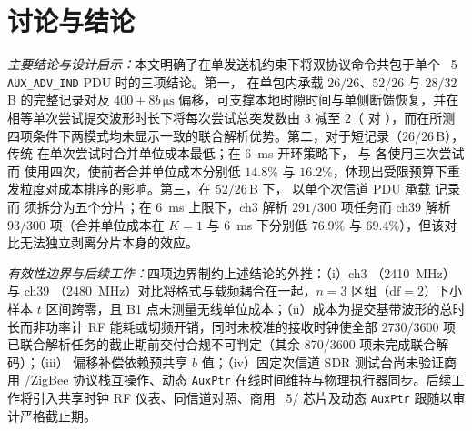 \section{讨论与结论}\label{sec:conclusion}

\emph{主要结论与设计启示：}本文明确了在单发送机约束下将双协议命令共包于单个 \ble{}~5 \texttt{AUX\_ADV\_IND} PDU 时的三项结论。第一，\proto{} 在单包内承载 $26/26$、$52/26$ 与 $28/32$\,B 的完整记录对及 $400{+}8b\,\si{\micro\second}$ 偏移，可支撑本地时隙时间与单侧断馈恢复，并在相等单次尝试提交波形时长下将每次尝试总突发数由 $3$ 减至 $2$（\modejc{} 对 \modesc{}），而在所测四项条件下两模式均未显示一致的联合解析优势。第二，对于短记录（$26/26$\,B），传统 \modelc{} 在单次尝试时合并单位成本最低；在 \SI{6}{ms} 开环策略下，\modejc{} 与 \modesc{} 各使用三次尝试而 \modelc{} 使用四次，使前者合并单位成本分别低 $14.8\%$ 与 $16.2\%$，体现出受限预算下重发粒度对成本排序的影响。第三，在 $52/26$\,B 下，\modejc{} 以单个次信道 PDU 承载 \ble{} 记录而 \modelc{} 须拆分为五个分片；在 \SI{6}{ms} 上限下，ch3 \modejc{} 解析 $291/300$ 项任务而 ch39 \modelc{} 解析 $93/300$ 项（合并单位成本在 $K{=}1$ 与 \SI{6}{ms} 下分别低 $76.9\%$ 与 $69.4\%$），但该对比无法独立剥离分片本身的效应。

\emph{有效性边界与后续工作：}四项边界制约上述结论的外推：（i）ch3 \modejc{}（\SI{2410}{MHz}）与 ch39 \modelc{}（\SI{2480}{MHz}）对比将格式与载频耦合在一起，$n{=}3$ 区组（$\text{df}{=}2$）下小样本 $t$ 区间跨零，且 B1 点未测量无线单位成本；（ii）成本为提交基带波形的总时长而非功率计 RF 能耗或切频开销，同时未校准的接收时钟使全部 \num{2730}/\num{3600} 项已联合解析任务的截止期前交付合规不可判定（其余 \num{870}/\num{3600} 项未完成联合解码）；（iii）\stdfour{} 偏移补偿依赖预共享 $b$ 值；（iv）固定次信道 SDR 测试台尚未验证商用 \ble{}/ZigBee 协议栈互操作、动态 \texttt{AuxPtr} 在线时间维持与物理执行器同步。后续工作将引入共享时钟 RF 仪表、同信道对照、商用 \ble{}~5/\stdfour{} 芯片及动态 \texttt{AuxPtr} 跟随以审计严格截止期。

